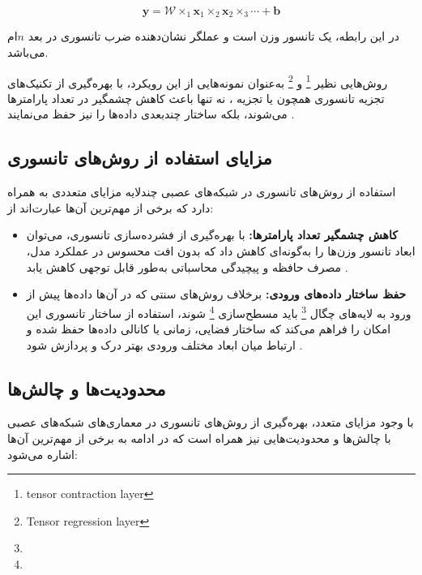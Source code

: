 \[
\mathbf{y} = \mathcal{W} \times_1 \mathbf{x}_1 \times_2 \mathbf{x}_2 \times_3 \cdots + \mathbf{b}
\]

در این رابطه،  یک تانسور وزن است و عملگر  نشان‌دهنده ضرب تانسوری در بعد $n$‌ام می‌باشد.

روش‌هایی نظیر  \footnote{tensor contraction layer} و  \footnote{Tensor regression layer} به‌عنوان نمونه‌هایی از این رویکرد، با بهره‌گیری از تکنیک‌های تجزیه تانسوری همچون  یا تجزیه ، نه تنها باعث کاهش چشمگیر در تعداد پارامترها می‌شوند، بلکه ساختار چندبعدی داده‌ها را نیز حفظ می‌نمایند \cite{kossaifi2017tensorcontraction, kossaifi2020tensorregression}.

\subsection*{مزایای استفاده از روش‌های تانسوری}

استفاده از روش‌های تانسوری در شبکه‌های عصبی چندلایه مزایای متعددی به همراه دارد که برخی از مهم‌ترین آن‌ها عبارت‌اند از:

\begin{itemize}
	\item \textbf{کاهش چشمگیر تعداد پارامترها:} با بهره‌گیری از فشرده‌سازی تانسوری، می‌توان ابعاد تانسور وزن‌ها را به‌گونه‌ای کاهش داد که بدون افت محسوس در عملکرد مدل، مصرف حافظه و پیچیدگی محاسباتی به‌طور قابل توجهی کاهش یابد \cite{lebedev2015cp, kossaifi2020tensorregression}.
	
	\item \textbf{حفظ ساختار داده‌های ورودی:} برخلاف روش‌های سنتی که در آن‌ها داده‌ها پیش از ورود به لایه‌های چگال \footnote{} باید مسطح‌سازی \footnote{} شوند، استفاده از ساختار تانسوری این امکان را فراهم می‌کند که ساختار فضایی، زمانی یا کانالی داده‌ها حفظ شده و ارتباط میان ابعاد مختلف ورودی بهتر درک و پردازش شود \cite{kossaifi2020tensorregression}.
\end{itemize}

\subsection*{محدودیت‌ها و چالش‌ها}

با وجود مزایای متعدد، بهره‌گیری از روش‌های تانسوری در معماری‌های شبکه‌های عصبی با چالش‌ها و محدودیت‌هایی نیز همراه است که در ادامه به برخی از مهم‌ترین آن‌ها اشاره می‌شود:

